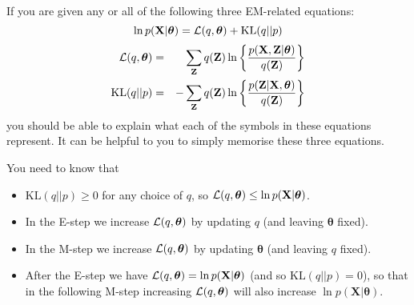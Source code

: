\documentclass{article}
\newcommand{\Xvec}{\ensuremath{\mathbf{X}}}
\newcommand{\Zvec}{\ensuremath{\mathbf{Z}}}
\newcommand{\thetavec}{\ensuremath{{\bm \theta}}}
\newcommand{\yntk}{You need to know}
\begin{document}
If you are given any or all of the following three EM-related equations:
  \[
    \ln p(\Xvec | \thetavec)  = {\cal L}(q, \thetavec) + \mathrm{KL}(q
      || p)
  \]
  \begin{eqnarray*}
    {\cal L}(q, \thetavec) & = & \sum_{\Zvec} q(\Zvec) \ln \left\{
      \frac{p(\Xvec,\Zvec| \thetavec)}{q(\Zvec)} \right\} \\
    \mathrm{KL}(q || p) & = & -\sum_{\Zvec} q(\Zvec) \ln \left\{
      \frac{p(\Zvec|\Xvec, \thetavec)}{q(\Zvec)} \right\}
  \end{eqnarray*}
you should be able to explain what each of the symbols in these
equations represent. It can be helpful to you to simply memorise these
three equations.

\yntk{} that
 \begin{itemize}
  \item $\mathrm{KL}(q
      || p) \geq 0$ for any choice of $q$, so ${\cal L}(q, \thetavec)
      \leq \ln p(\Xvec | \thetavec)$.
    \item In the E-step we increase ${\cal L}(q, \thetavec)$ by
      updating $q$ (and leaving $\thetavec$ fixed).
    \item In the M-step we increase ${\cal L}(q, \thetavec)$ by
      updating $\thetavec$ (and leaving $q$ fixed).
    \item After the E-step we have
      ${\cal L}(q, \thetavec) = \ln p(\Xvec | \thetavec)$ (and so $\mathrm{KL}(q
      || p) = 0$), so that in
      the following M-step increasing ${\cal L}(q, \thetavec)$ will
      also increase $\ln p(\Xvec | \thetavec)$.
  \end{itemize}
 
\end{document}
